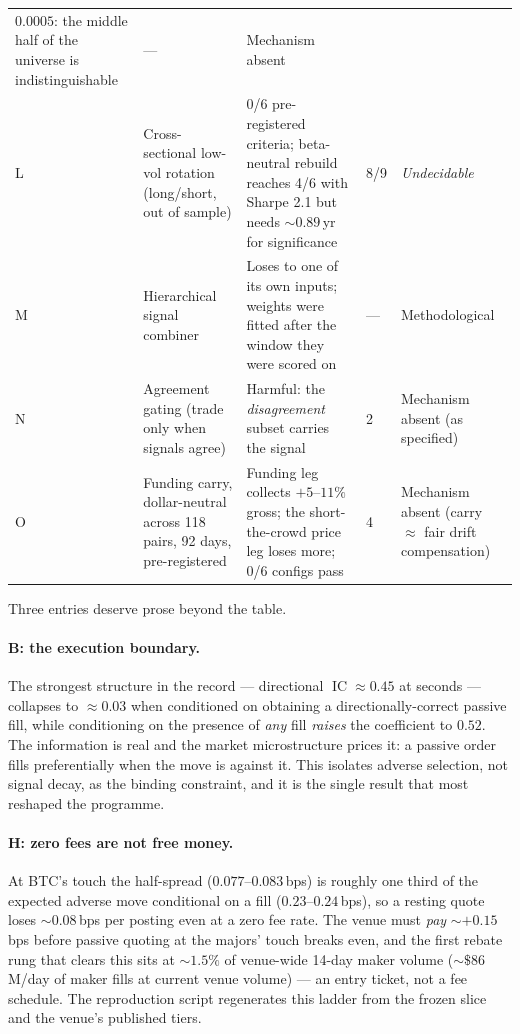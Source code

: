 \documentclass[11pt,a4paper]{article}
\DeclareMathOperator{\IC}{IC}
\newcommand{\bottomrule}{\hline\hline}
\begin{document}
{\begin{longtable}{p{0.5cm} p{5.2cm} p{3.8cm} p{1.4cm} p{2.9cm}}
$0.0005$: the middle half of the universe is indistinguishable & --- &
Mechanism absent \\
L & Cross-sectional low-vol rotation (long/short, out of sample) & 0/6
pre-registered criteria; beta-neutral rebuild reaches 4/6 with Sharpe
2.1 but needs ${\sim}0.89$\,yr for significance & 8/9 &
\emph{Undecidable} \\
M & Hierarchical signal combiner & Loses to one of its own inputs;
weights were fitted after the window they were scored on & --- &
Methodological \\
N & Agreement gating (trade only when signals agree) & Harmful: the
\emph{disagreement} subset carries the signal & 2 & Mechanism absent
(as specified) \\
O & Funding carry, dollar-neutral across 118 pairs, 92 days,
pre-registered & Funding leg collects $+5$--$11\%$ gross; the
short-the-crowd price leg loses more; 0/6 configs pass & 4 & Mechanism
absent (carry $\approx$ fair drift compensation) \\
\bottomrule
\end{longtable}}

Three entries deserve prose beyond the table.

\paragraph{B: the execution boundary.} The strongest structure in the
record --- directional $\IC \approx 0.45$ at seconds --- collapses to
${\approx}0.03$ when conditioned on obtaining a directionally-correct
passive fill, while conditioning on the presence of \emph{any} fill
\emph{raises} the coefficient to $0.52$. The information is real and
the market microstructure prices it: a passive order fills
preferentially when the move is against it. This isolates adverse
selection, not signal decay, as the binding constraint, and it is the
single result that most reshaped the programme.

\paragraph{H: zero fees are not free money.} At BTC's touch the
half-spread ($0.077$--$0.083$\,bps) is roughly one third of the
expected adverse move conditional on a fill ($0.23$--$0.24$\,bps), so a
resting quote loses ${\sim}0.08$\,bps per posting even at a zero fee
rate. The venue must \emph{pay} ${\sim}+0.15$\,bps before passive
quoting at the majors' touch breaks even, and the first rebate rung
that clears this sits at ${\sim}1.5\%$ of venue-wide 14-day maker
volume (${\sim}\$86$M/day of maker fills at current venue volume) ---
an entry ticket, not a fee schedule. The reproduction script regenerates
this ladder from the frozen slice and the venue's published tiers.
\end{document}
